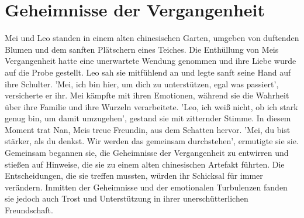 \documentclass[12pt]{article} %
\begin{document}
\section{ Geheimnisse der Vergangenheit }
\begin{minipage}{\textwidth}
    Mei und Leo standen in einem alten chinesischen Garten, umgeben von duftenden Blumen und dem sanften Plätschern eines Teiches. Die Enthüllung von Meis Vergangenheit hatte eine unerwartete Wendung genommen und ihre Liebe wurde auf die Probe gestellt. Leo sah sie mitfühlend an und legte sanft seine Hand auf ihre Schulter. 'Mei, ich bin hier, um dich zu unterstützen, egal was passiert', versicherte er ihr. Mei kämpfte mit ihren Emotionen, während sie die Wahrheit über ihre Familie und ihre Wurzeln verarbeitete. 'Leo, ich weiß nicht, ob ich stark genug bin, um damit umzugehen', gestand sie mit zitternder Stimme. In diesem Moment trat Nan, Meis treue Freundin, aus dem Schatten hervor. 'Mei, du bist stärker, als du denkst. Wir werden das gemeinsam durchstehen', ermutigte sie sie. Gemeinsam begannen sie, die Geheimnisse der Vergangenheit zu entwirren und stießen auf Hinweise, die sie zu einem alten chinesischen Artefakt führten. Die Entscheidungen, die sie treffen mussten, würden ihr Schicksal für immer verändern. Inmitten der Geheimnisse und der emotionalen Turbulenzen fanden sie jedoch auch Trost und Unterstützung in ihrer unerschütterlichen Freundschaft.
\end{minipage}
\end{document}
